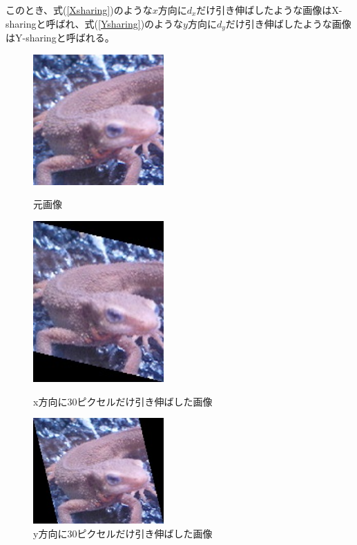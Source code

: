         このとき、式(\ref{Xsharing})のような$x$方向に$d_x$だけ引き伸ばしたような画像はX-sharingと呼ばれ、式(\ref{Ysharing})のような$y$方向に$d_y$だけ引き伸ばしたような画像はY-sharingと呼ばれる。
        \begin{figure}[htbp]
            \begin{minipage}{0.5\hsize}
                \begin{center}
                    \includegraphics[width=50mm]{./8_appendix/img/imori.jpg}
                \end{center}
                \caption{元画像}
            \end{minipage}
            \begin{minipage}{0.5\hsize}
                \begin{center}
                    \includegraphics[width=50mm]{./8_appendix/img/imori_xshar.jpg}
                \end{center}
                \caption{x方向に30ピクセルだけ引き伸ばした画像}
            \end{minipage}
            \begin{minipage}{0.5\hsize}
                \begin{center}
                    \includegraphics[width=50mm]{./8_appendix/img/imori_yshar.jpg}
                \end{center}
                \caption{y方向に30ピクセルだけ引き伸ばした画像}
            \end{minipage}
        \end{figure}


